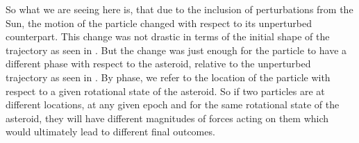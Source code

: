 %
\newline\newline
%
So what we are seeing here is, that due to the inclusion of perturbations from the Sun, the motion of the particle changed with respect to its unperturbed counterpart. This change was not drastic in terms of the initial shape of the trajectory as seen in . But the change was just enough for the particle to have a different phase with respect to the asteroid, relative to the unperturbed trajectory as seen in . By phase, we refer to the location of the particle with respect to a given rotational state of the asteroid. So if two particles are at different locations, at any given epoch and for the same rotational state of the asteroid, they will have different magnitudes of forces acting on them which would ultimately lead to different final outcomes.
